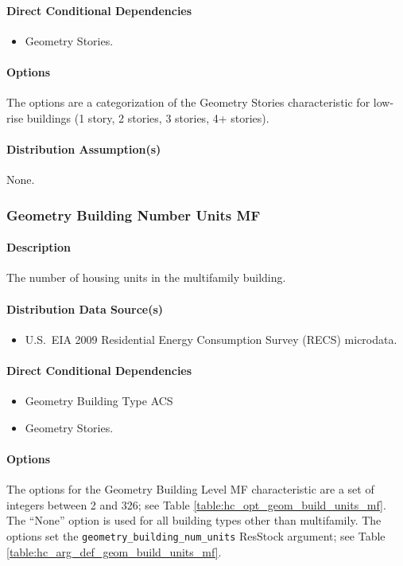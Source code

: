 \paragraph{Direct Conditional Dependencies}
\begin{itemize}
    \item Geometry Stories.
\end{itemize}

\paragraph{Options}
The options are a categorization of the Geometry Stories characteristic for low-rise buildings (1 story, 2 stories, 3 stories, 4+ stories).

\paragraph{Distribution Assumption(s)}
None.

\subsubsection{Geometry Building Number Units MF}
\paragraph{Description}
The number of housing units in the multifamily building.

\paragraph{Distribution Data Source(s)}
\begin{itemize}
    \item U.S.~EIA 2009 Residential Energy Consumption Survey (RECS) microdata.
\end{itemize}

\paragraph{Direct Conditional Dependencies}
\begin{itemize}
    \item Geometry Building Type ACS
    \item Geometry Stories.
\end{itemize}

\paragraph{Options}
The options for the Geometry Building Level MF characteristic are a set of integers between 2 and 326; see Table \ref{table:hc_opt_geom_build_units_mf}. The ``None'' option is used for all building types other than multifamily. The options set the \texttt{geometry\_building\_num\_units} ResStock argument; see Table \ref{table:hc_arg_def_geom_build_units_mf}.

